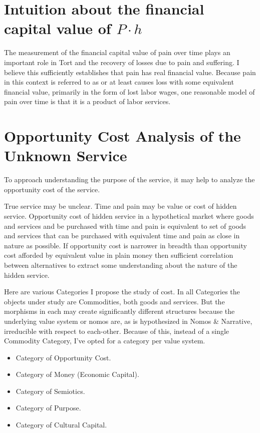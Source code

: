 \documentclass[11pt]{book}
\begin{document}
\section{Intuition about the financial capital value of $P{\cdot}h$}

The measurement of the financial capital value of pain over time plays an important role in Tort and the recovery of losses due to pain and suffering. I believe this sufficiently establishes that pain has real financial value. Because pain in this context is referred to as or at least causes loss with some equivalent financial value, primarily in the form of lost labor wages, one reasonable model of pain over time is that it is a product of labor services.

\section{Opportunity Cost Analysis of the Unknown Service}

To approach understanding the purpose of the service, it may help to analyze the opportunity cost of the service.

True service may be unclear. Time and pain may be value or cost of hidden service. Opportunity cost of hidden service in a hypothetical market where goods and services and be purchased with time and pain is equivalent to set of goods and services that can be purchased with equivalent time and pain as close in nature as possible.
If opportunity cost is narrower in breadth than opportunity cost afforded by equivalent value in plain money then sufficient correlation between alternatives to extract some understanding about the nature of the hidden service.

Here are various Categories I propose the study of cost. In all Categories the objects under study are Commodities, both goods and services. But the morphisms in each may create significantly different structures because the underlying value system or nomos are, as is hypothesized in Nomos \& Narrative, irreducible with respect to each-other. Because of this, instead of a single Commodity Category, I've opted for a category per value system.

\begin{itemize}
	\item Category of Opportunity Cost.
	\item Category of Money (Economic Capital).
	\item Category of Semiotics.
	\item Category of Purpose.
	\item Category of Cultural Capital.
\end{itemize}
\end{document}
